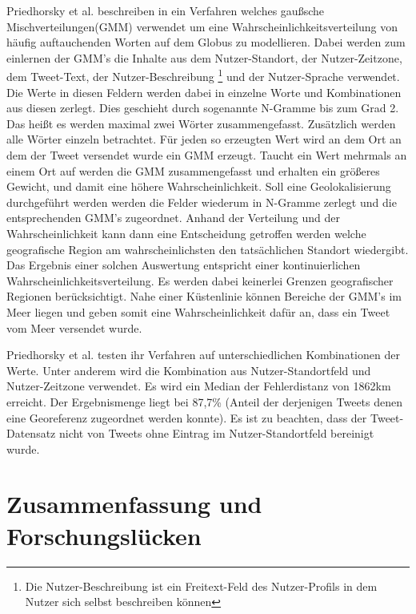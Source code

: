 		Priedhorsky et al. beschreiben in \cite{Priedhorsky2013} ein Verfahren welches gaußsche Mischverteilungen(GMM) verwendet um eine Wahrscheinlichkeitsverteilung von häufig auftauchenden Worten auf dem Globus zu modellieren.
		Dabei werden zum einlernen der GMM's die Inhalte aus dem Nutzer-Standort, der Nutzer-Zeitzone, dem Tweet-Text, der Nutzer-Beschreibung \footnote{Die Nutzer-Beschreibung ist ein Freitext-Feld des Nutzer-Profils in dem Nutzer sich selbst beschreiben können} und der Nutzer-Sprache verwendet.
		Die Werte in diesen Feldern werden dabei in einzelne Worte und Kombinationen aus diesen zerlegt.
		Dies geschieht durch sogenannte N-Gramme bis zum Grad 2. 
		Das heißt es werden maximal zwei Wörter zusammengefasst.
		Zusätzlich werden alle Wörter einzeln betrachtet.
		Für jeden so erzeugten Wert wird an dem Ort an dem der Tweet versendet wurde ein GMM erzeugt.
		Taucht ein Wert mehrmals an einem Ort auf werden die GMM zusammengefasst und erhalten ein größeres Gewicht, und damit eine höhere Wahrscheinlichkeit.
		Soll eine Geolokalisierung durchgeführt werden werden die Felder wiederum in N-Gramme zerlegt und die entsprechenden GMM's zugeordnet. 
		Anhand der Verteilung und der Wahrscheinlichkeit kann dann eine Entscheidung getroffen werden welche geografische Region am wahrscheinlichsten den tatsächlichen Standort wiedergibt. 
		Das Ergebnis einer solchen Auswertung entspricht einer kontinuierlichen Wahrscheinlichkeitsverteilung. 
		Es werden dabei keinerlei Grenzen geografischer Regionen berücksichtigt. 
		Nahe einer Küstenlinie können Bereiche der GMM's im Meer liegen und geben somit eine Wahrscheinlichkeit dafür an, dass ein Tweet vom Meer versendet wurde.  

		Priedhorsky et al. testen ihr Verfahren auf unterschiedlichen Kombinationen der Werte. 
		Unter anderem wird die Kombination aus Nutzer-Standortfeld und Nutzer-Zeitzone verwendet. 
		Es wird ein Median der Fehlerdistanz von 1862km erreicht. 
		Der Ergebnismenge liegt bei 87,7\% (Anteil der derjenigen Tweets denen eine Georeferenz zugeordnet werden konnte).
		Es ist zu beachten, dass der Tweet-Datensatz nicht von Tweets ohne Eintrag im Nutzer-Standortfeld bereinigt wurde. 


	\section{Zusammenfassung und Forschungslücken}


